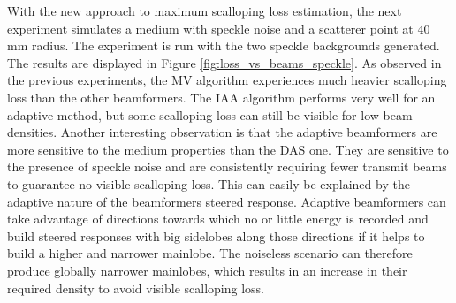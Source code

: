 With the new approach to maximum scalloping loss estimation, the next experiment simulates a medium with speckle noise and a scatterer point at $40~$mm radius. The experiment is run with the two speckle backgrounds generated. The results are displayed in Figure \ref{fig:loss_vs_beams_speckle}.
As observed in the previous experiments, the MV algorithm experiences much heavier scalloping loss than the other beamformers. The IAA algorithm performs very well for an adaptive method, but some scalloping loss can still be visible for low beam densities. Another interesting observation is that the adaptive beamformers are more sensitive to the medium properties than the DAS one. They are sensitive to the presence of speckle noise and are consistently requiring fewer transmit beams to guarantee no visible scalloping loss.
This can easily be explained by the adaptive nature of the beamformers steered response. Adaptive beamformers can take advantage of directions towards which no or little energy is recorded and build steered responses with big sidelobes along those directions if it helps to build a higher and narrower mainlobe. The noiseless scenario can therefore produce globally narrower mainlobes, which results in an increase in their required density to avoid visible scalloping loss.
